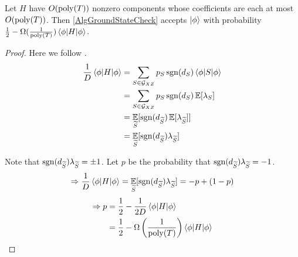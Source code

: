 \begin{theorem}\label{ThmXZCheck}
	Let $H$ have $O(\operatorname*{\operatorname{poly}}(T))$ nonzero components whose coefficients are each at most $O(\operatorname*{\operatorname{poly}}(T))$.
	Then \autoref{AlgGroundStateCheck} accepts $\ket\phi$ with probability $\frac{1}{2}-\Omega(\frac{1}{\operatorname*{\operatorname{poly}}(T)})\braket{\phi|H|\phi}$.
\end{theorem}
\begin{proof}

	Here we follow \cite{PhysRevA.93.022326}.
	\begin{align*}
		\frac{1}{D}\braket{\phi|H|\phi}&=\sum_{S\in\mathcal{G}_{XZ}} p_S\operatorname{sgn}(d_S)\braket{\phi|S|\phi}\\
		&=\sum_{S\in\mathcal{G}_{XZ}} p_S\operatorname{sgn}(d_S)\operatorname*{\mathbb{E}}[\lambda_S]\\
		&=\operatorname*{\mathbb{E}}_{\widetilde{S}}[\operatorname{sgn}(d_{\widetilde{S}})\operatorname*{\mathbb{E}}[\lambda_{\widetilde{S}}]]\\
		&=\operatorname*{\mathbb{E}}_{\widetilde{S}}[\operatorname{sgn}(d_{\widetilde{S}})\lambda_{\widetilde{S}}]
	\end{align*}

	Note that $\operatorname{sgn}(d_{\widetilde{S}})\lambda_{\widetilde{S}}=\pm1$. Let $p$ be the probability that $\operatorname{sgn}(d_{\widetilde{S}})\lambda_{\widetilde{S}}=-1$.
	$$\Rightarrow \frac{1}{D}\braket{\phi|H|\phi}=\operatorname*{\mathbb{E}}_{\widetilde{S}}[\operatorname{sgn}(d_{\widetilde{S}})\lambda_{\widetilde{S}}]=-p+(1-p)$$
	\begin{align*}
		\Rightarrow p&=\frac{1}{2}-\frac{1}{2D}\braket{\phi|H|\phi}\\
		&=\frac{1}{2}-\Omega\left(\frac{1}{\operatorname*{\operatorname{poly}}(T)}\right)\braket{\phi|H|\phi}
	\end{align*}

\end{proof}
